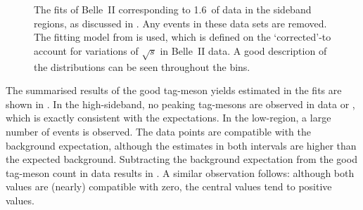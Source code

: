 \begin{figure}[hbtp!]
    \centering
    \caption{\label{fig:sideband_mc_fit}    
    The \Mbc fits of Belle~II \MC corresponding to 1.6~\invab of data in the \EB sideband regions,
    as discussed in .
    Any \BtoXsgamma events in these data sets are removed.
    The fitting model from  is used,
    which is defined on the `corrected'-\Mbc to account for variations of $\sqrt{s}$ in Belle~II data.
    A good description of the \Mbc distributions can be seen throughout the \EB bins.
    }
\end{figure}

The summarised results of the good tag-\B meson yields estimated in the \Mbc fits are shown in .
In the high-\EB sideband, no peaking tag-\B mesons are observed in data or \MC, which is exactly consistent with the expectations.
In the low-\EB region, a large number of events is observed.
The data points are compatible with the background expectation, although the estimates in both intervals are higher than the expected background.
Subtracting the background expectation from the good tag-\B meson count in data results in .
A similar observation follows: although both values are (nearly) compatible with zero,
the central values tend to positive values.

